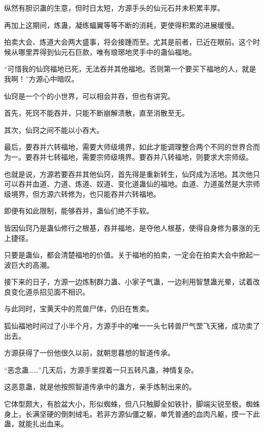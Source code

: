 
\begin{this_body}

纵然有胆识蛊的生意，但时日太短，方源手头的仙元石并未积累丰厚。

再加上这期间，炼蛊，凝练蝠翼等等不断的消耗，更使得积累的进展缓慢。

拍卖大会、炼道大会两大盛事，将会接踵而至。尤其是前者，已近在眼前。这个时候从哪里弄得到仙元石巨款，唯有琅琊地灵手中的蛊仙福地。

“可惜我的仙窍福地已死，无法吞并其他福地。否则第一个要买下福地的人，就是我啊！”方源心中暗叹。

仙窍是一个个的小世界，可以相会并吞，但也有讲究。

首先，死窍不能吞并，只能不断崩解溃散，直至消散至无。

其次，仙窍之间不能以小吞大。

最后，要吞并六转福地，需要大师级境界，如此才能调理整合两个不同的世界合而为一。要吞并七转福地，需要宗师级境界。要吞并八转福地，则要求大宗师级。

也就是说，方源若要吞并其他仙窍，首先得是重新转生，仙窍成为活地。其次他只可以吞并血道、力道、炼道、奴道、变化道蛊仙的福地。血道、力道虽然是大宗师级境界，但方源六转修为，也只能吞并六转福地。

即便有如此限制，能够吞并，蛊仙们绝不手软。

皆因仙窍乃是蛊仙修行之根基，吞并福地，是夺他人根基，使得自身修为暴涨的无上捷径。

只要是蛊仙，都会清楚福地的价值。关于福地的拍卖，一定会在拍卖大会中掀起一波巨大的高潮。

接下来的日子，方源一边炼制群力蛊、小家子气蛊，一边利用智慧蛊光晕，试着改良变化道杀招见面不相识。

与此同时，宝黄天中的荒兽尸体，仍旧在售卖。

狐仙福地时间过了小半个月，方源手中的唯一一头七转兽尸气罡飞天猪，成功卖了出去。

方源获得了一份他很久以前，就朝思暮想的智道传承。

“恶念蛊……”几天后，方源手里捏着一只五转凡蛊，神情复杂。

这恶意蛊，就是他按照智道传承中的蛊方，亲手炼制出来的。

它体型颇大，有脸盆大小，形似蜘蛛，但八只触脚全如铁针，脚端尖锐至极。蜘蛛身上，长满坚硬的倒刺绒毛。若非方源仙僵之躯，单凭普通的血肉凡躯，摸一下此蛊，就能扎出血来。


\end{this_body}
